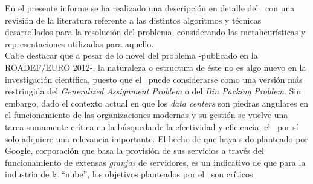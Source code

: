 \documentclass[../informe2.tex]{subfiles}
\begin{document}

En el presente informe se ha realizado una descripción en detalle del \mrp\, con una revisión de la literatura referente a las distintos algoritmos y técnicas desarrollados para la resolución del problema, considerando las metaheurísticas y representaciones utilizadas para aquello. \\
Cabe destacar que a pesar de lo novel del problema -publicado en la ROADEF/EURO 2012-, la naturaleza o estructura de éste no es algo nuevo en la investigación científica, puesto que el \mrp\ puede considerarse como una versión más restringida del \textit{Generalized Assignment Problem} o del \textit{Bin Packing Problem}. Sin embargo, dado el contexto actual en que los \textit{data centers} son piedras angulares en el funcionamiento de las organizaciones modernas y su gestión se vuelve una tarea sumamente crítica en la búsqueda de la efectividad y eficiencia, el \mrp\ por sí solo adquiere una relevancia importante. El hecho de que haya sido planteado por Google, corporación que basa la provisión de sus servicios a través del funcionamiento de extensas \textit{granjas} de servidores, es un indicativo de que para la industria de la ``nube'', los objetivos planteados por el  \mrp\ son críticos. \\
\end{document}
